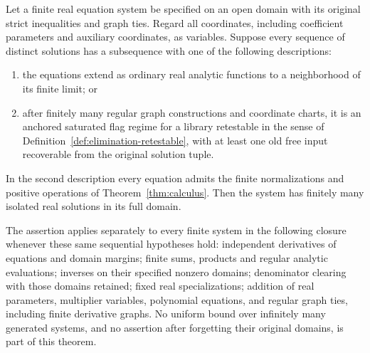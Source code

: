 \begin{theorem}
\label{thm:absolute-zero}
Let a finite real equation system be specified on an open domain
with its original strict inequalities and graph ties.  Regard all
coordinates, including coefficient parameters and auxiliary
coordinates, as variables.  Suppose every sequence of distinct
solutions has a subsequence with one of the following descriptions:
\begin{enumerate}
\item the equations extend as ordinary real analytic functions to a
neighborhood of its finite limit; or
\item after finitely many regular graph constructions and coordinate
charts, it is an anchored saturated flag regime for a library
retestable in the sense of Definition~\ref{def:elimination-retestable},
with at least one old free input recoverable from the original
solution tuple.
\end{enumerate}
In the second description every equation admits the finite
normalizations and positive operations of
Theorem~\ref{thm:calculus}.  Then the system has finitely many isolated
real solutions in its full domain.

The assertion applies separately to every finite system in the
following closure whenever these same sequential hypotheses hold:
independent derivatives of equations and domain margins; finite sums,
products and regular analytic evaluations; inverses on their specified
nonzero domains; denominator clearing with those domains retained;
fixed real specializations; addition of real parameters, multiplier
variables, polynomial equations, and regular graph ties, including
finite derivative graphs.  No uniform bound over infinitely many
generated systems, and no assertion after forgetting their original
domains, is part of this theorem.
\end{theorem}

